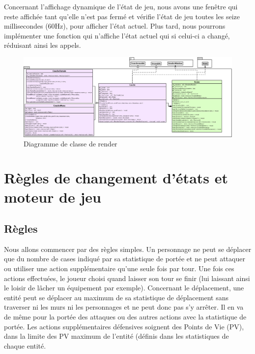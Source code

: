 \documentclass[a4paper,12pt]{article}
\begin{document}
Concernant l'affichage dynamique de l'état de jeu, nous avons une fenêtre qui reste affichée tant qu'elle n'est pas fermé et vérifie l'état de jeu toutes les seize millisecondes (60Hz), pour afficher l'état actuel. Plus tard, nous pourrons implémenter une fonction qui n'affiche l'état actuel qui si celui-ci a changé, réduisant ainsi les appels.

\begin{figure}[hbt!]
    \centering
    \includegraphics[width =.8\paperwidth, angle=0]{images/render.png}
    \caption{Diagramme de classe de render}
    \label{fig:render}
\end{figure}




\clearpage
\section{Règles de changement d'états et moteur de jeu}

\subsection{Règles}
Nous allons commencer par des règles simples. Un personnage ne peut se déplacer que du nombre de cases indiqué par sa statistique de portée et ne peut attaquer ou utiliser une action supplémentaire qu'une seule fois par tour. Une fois ces actions effectuées, le joueur choisi quand laisser son tour se finir (lui laissant ainsi le loisir de lâcher un équipement par exemple). Concernant le déplacement, une entité peut se déplacer au maximum de sa statistique de déplacement sans traverser ni les murs ni les personnages et ne peut donc pas s'y arrêter. Il en va de même pour la portée des attaques ou des autres actions avec la statistique de portée. Les actions supplémentaires défensives soignent des Points de Vie (PV), dans la limite des PV maximum de l'entité (définis dans les statistiques de chaque entité.
\end{document}

